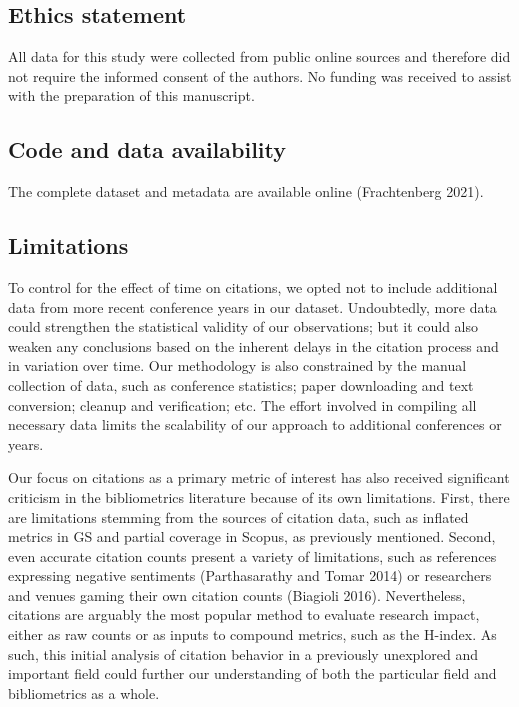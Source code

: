 \documentclass{article}
\begin{document}
\hypertarget{ethics-statement}{%
\subsection*{Ethics statement}\label{ethics-statement}}

All data for this study were collected from public online sources and therefore did not require the informed consent of the authors.
No funding was received to assist with the preparation of this manuscript.

\hypertarget{code-and-data-availability}{%
\subsection*{Code and data availability}\label{code-and-data-availability}}

The complete dataset and metadata are available online (Frachtenberg 2021).

\hypertarget{limitations}{%
\subsection*{Limitations}\label{limitations}}

To control for the effect of time on citations, we opted not to include additional data from more recent conference years in our dataset. Undoubtedly, more data could strengthen the statistical validity of our observations; but it could also weaken any conclusions based on the inherent delays in the citation process and in variation over time.
Our methodology is also constrained by the manual collection of data, such as conference statistics; paper downloading and text conversion; cleanup and verification; etc.
The effort involved in compiling all necessary data limits the scalability of our approach to additional conferences or years.

Our focus on citations as a primary metric of interest has also received significant criticism in the bibliometrics literature because of its own limitations.
First, there are limitations stemming from the sources of citation data, such as inflated metrics in GS and partial coverage in Scopus, as previously mentioned.
Second, even accurate citation counts present a variety of limitations, such as references expressing negative sentiments (Parthasarathy and Tomar 2014) or researchers and venues gaming their own citation counts (Biagioli 2016).
Nevertheless, citations are arguably the most popular method to evaluate research impact, either as raw counts or as inputs to compound metrics, such as the H-index.
As such, this initial analysis of citation behavior in a previously unexplored and important field could further our understanding of both the particular field and bibliometrics as a whole.
\end{document}

